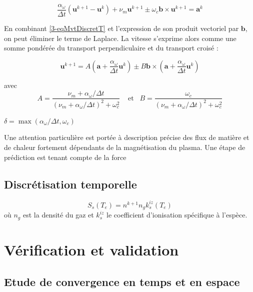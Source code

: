 \begin{refsection}
\begin{equation}
\label{3-eqMvtDiscretT}
\frac{\alpha_\omega}{\Delta t}\left(\mathbf{u}^{k+1}-\mathbf{u}^{k}\right) + 
\nu_m\mathbf{u}^{k+1}\pm\omega_{c}\mathbf{b}\times\mathbf{u}^{k+1}=
\mathbf a^k
\end{equation}

En combinant \ref{3-eqMvtDiscretT} et l'expression de son produit vectoriel
par $\mathbf b$, on peut éliminer le terme de Laplace. La vitesse s'exprime
alors comme une somme pondérée du transport perpendiculaire et du transport
croisé :

\begin{equation}
\label{3-eqMvtPonderee}
\mathbf{u}^{k+1}=A\left(\mathbf a + \frac{\alpha_\omega}{\Delta
t}\mathbf{u}^{k}\right)\pm B\mathbf b\times\left(\mathbf a +
\frac{\alpha_\omega}{\Delta t}\mathbf{u}^{k}\right)
\end{equation}

avec 
\begin{equation*}
\label{3-eqMvtPonderee}
A=\frac{\nu_m+\alpha_\omega/\Delta t}{(\nu_m+\alpha_\omega/\Delta
t)^2+\omega_c^2}\;\;\;\;\text{et}\;\;\;B=\frac{\omega_c}{(\nu_m+\alpha_\omega/\Delta
t)^2+\omega_c^2}
\end{equation*}

$\delta=\max(\alpha_\omega/\Delta t,\omega_c)$


 Une attention particulière est portée à description précise des 
 flux de matière et de chaleur fortement dépendants de la magnétisation du
 plasma. Une étape de prédiction est tenant compte de la force


\subsection{Discrétisation temporelle}

\begin{equation}
S_s(T_e)=n^{k+1}n_gk_{s}^{iz}(T_e)
\end{equation}
où $n_g$ est la densité du gaz et $k_{s}^{iz}$ le coefficient d'ionisation spécifique à l'espèce.
\cite{Hemsworth}

\section{Vérification et validation}

\subsection{Etude de convergence en temps et en espace}

\end{refsection}
